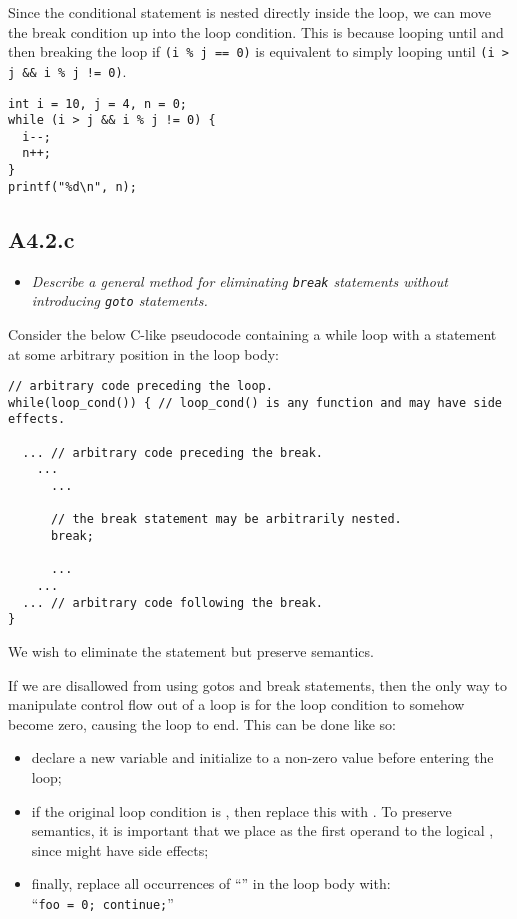 Since the conditional  statement is nested directly inside the
 loop, we can move the break condition up into the loop condition.
This is because looping until  and then breaking the loop if
\texttt{(i \% j == 0)} is equivalent to simply looping until \texttt{(i > j \&\&
i \% j != 0)}.

\begin{verbatim}
int i = 10, j = 4, n = 0;
while (i > j && i % j != 0) {
  i--;
  n++;
}
printf("%d\n", n);
\end{verbatim}


\newpage
\subsection{A4.2.c}

\begin{itemize}
  \item \emph{Describe a general method for eliminating \emph{\texttt{break}}
    statements without introducing \emph{\texttt{goto}} statements.}
\end{itemize}

Consider the below C-like pseudocode containing a while loop with a 
statement at some arbitrary position in the loop body:

\begin{verbatim}
// arbitrary code preceding the loop.
while(loop_cond()) { // loop_cond() is any function and may have side effects.

  ... // arbitrary code preceding the break.
    ...
      ...

      // the break statement may be arbitrarily nested.
      break;

      ...
    ... 
  ... // arbitrary code following the break.
}
\end{verbatim}

We wish to eliminate the  statement but preserve semantics.

If we are disallowed from using gotos and break statements, then the only way to
manipulate control flow out of a loop is for the loop condition to somehow
become zero, causing the loop to end. This can be done like so:

\begin{itemize}

  \item declare a new variable  and initialize to a non-zero value
    before entering the loop;

  \item if the original loop condition is , then replace this
    with . To preserve semantics, it is important that we
    place  as the first operand to the logical , since
     might have side effects;

  \item finally, replace all occurrences of ``'' in the loop body
    with:\\ ``\texttt{foo = 0; continue;}''

\end{itemize}

